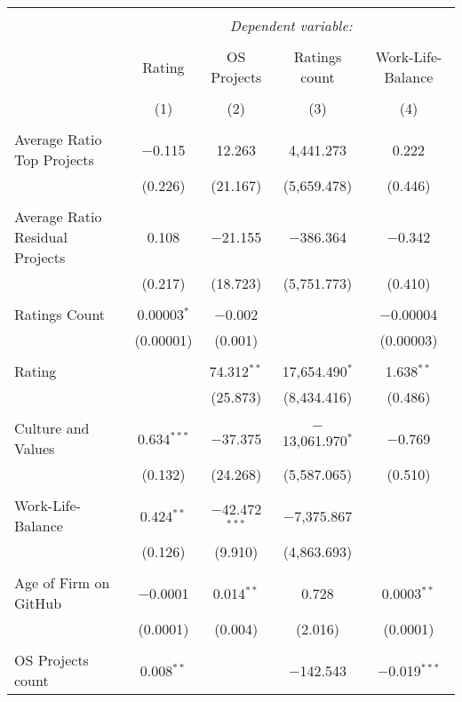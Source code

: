 
\begin{tabular}{@{\extracolsep{5pt}}lcccc}
\\[-1.8ex]\hline
\hline \\[-1.8ex]
 & \multicolumn{4}{c}{\textit{Dependent variable:}} \\
\cline{2-5}
\\[-1.8ex] & Rating & OS Projects & Ratings count & Work-Life-Balance \\
\\[-1.8ex] & (1) & (2) & (3) & (4)\\
\hline \\[-1.8ex]
 Average Ratio Top Projects & $-$0.115 & 12.263 & 4,441.273 & 0.222 \\
  & (0.226) & (21.167) & (5,659.478) & (0.446) \\
  & & & & \\
 Average Ratio Residual Projects & 0.108 & $-$21.155 & $-$386.364 & $-$0.342 \\
  & (0.217) & (18.723) & (5,751.773) & (0.410) \\
  & & & & \\
 Ratings Count & 0.00003$^{*}$ & $-$0.002 &  & $-$0.00004 \\
  & (0.00001) & (0.001) &  & (0.00003) \\
  & & & & \\
 Rating &  & 74.312$^{**}$ & 17,654.490$^{*}$ & 1.638$^{**}$ \\
  &  & (25.873) & (8,434.416) & (0.486) \\
  & & & & \\
 Culture and Values & 0.634$^{***}$ & $-$37.375 & $-$13,061.970$^{*}$ & $-$0.769 \\
  & (0.132) & (24.268) & (5,587.065) & (0.510) \\
  & & & & \\
 Work-Life-Balance & 0.424$^{**}$ & $-$42.472$^{***}$ & $-$7,375.867 &  \\
  & (0.126) & (9.910) & (4,863.693) &  \\
  & & & & \\
 Age of Firm on GitHub & $-$0.0001 & 0.014$^{**}$ & 0.728 & 0.0003$^{**}$ \\
  & (0.0001) & (0.004) & (2.016) & (0.0001) \\
  & & & & \\
 OS Projects count & 0.008$^{**}$ &  & $-$142.543 & $-$0.019$^{***}$ \\

\end{tabular}
